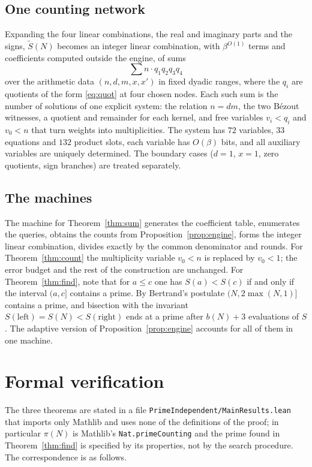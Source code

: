 \documentclass[11pt]{amsart}
\theoremstyle{remark}
\newcommand{\lean}[1]{\texttt{#1}}
\begin{document}
\subsection{One counting network}
Expanding the four linear combinations, the real and imaginary parts and the
signs, $\widetilde S(N)$ becomes an integer linear combination, with
$\beta^{O(1)}$ terms and coefficients computed outside the engine, of sums
\[
  \sum n\cdot q_1q_2q_3q_4
\]
over the arithmetic data $(n,d,m,x,x')$ in fixed dyadic ranges, where the
$q_i$ are quotients of the form \eqref{eq:quot} at four chosen nodes.  Each
such sum is the number of solutions of one explicit system: the relation
$n=dm$, the two B\'ezout witnesses, a quotient and remainder for each kernel,
and free variables $v_i<q_i$ and $v_0<n$ that turn weights into
multiplicities.  The system has $72$ variables, $33$ equations and $132$
product slots, each variable has $O(\beta)$ bits, and all auxiliary variables are
uniquely determined.  The boundary cases ($d=1$, $x=1$, zero quotients, sign
branches) are treated separately.

\subsection{The machines}
The machine for Theorem~\ref{thm:sum} generates the coefficient table,
enumerates the queries, obtains the counts from
Proposition~\ref{prop:engine}, forms the integer linear combination, divides
exactly by the common denominator and rounds.  For Theorem~\ref{thm:count}
the multiplicity variable $v_0<n$ is replaced by $v_0<1$; the error budget
and the rest of the construction are unchanged.  For
Theorem~\ref{thm:find}, note that for $a\le c$ one has $S(a)<S(c)$ if and
only if the interval $(a,c]$ contains a prime.  By Bertrand's postulate
$(N,2\max(N,1)]$ contains a prime, and bisection with the invariant
$S(\mathrm{left})=S(N)<S(\mathrm{right})$ ends at a prime after $b(N)+3$
evaluations of $S$.  The adaptive version of
Proposition~\ref{prop:engine} accounts for all of them in one machine.

\section{Formal verification}

The three theorems are stated in a file \lean{PrimeIndependent/MainResults.lean}
that imports only Mathlib and uses none of the definitions of the proof; in
particular $\pi(N)$ is Mathlib's \lean{Nat.primeCounting} and the prime found
in Theorem~\ref{thm:find} is specified by its properties, not by the search
procedure.  The correspondence is as follows.
\end{document}
